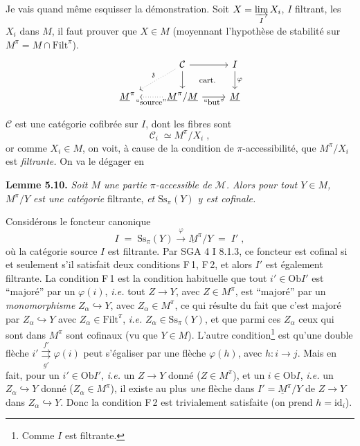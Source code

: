 \documentclass[11pt]{article}
\newcommand{\printedpage}[1]{\marginpar{\raggedright\footnotesize p.~#1}}
\newcommand{\msp}[1]{\marginpar{\raggedright\footnotesize [#1]}}
\newcommand{\Filt}{\mathrm{Filt}}
\newcommand{\Ob}{\mathrm{Ob}}
\newcommand{\Ss}{\mathrm{Ss}}
\newcommand{\M}{\mathcal{M}}
\newcommand{\Ci}{\mathcal{C}}
\begin{document}
\msp{page 62}

Je vais quand même esquisser la démonstration. Soit $X = \varinjlim\limits_{I} X_i$, $I$ filtrant, les $X_i$ dans $M$, il faut prouver que $X \in M$ (moyennant l'hypothèse de stabilité sur $M^\pi = M \cap \Filt^\pi$).
\printedpage{37}
\[
\begin{tikzcd}
& \Ci \arrow[r] \arrow[d] \arrow[dl, dotted, "\mathfrak{z}"'] \arrow[dr, phantom, "\text{\footnotesize cart.}"] & I \arrow[d, "\varphi"] \\
\underline{M}^\pi & \underline{M}^\pi/\underline{M} \arrow[l, dotted, "\text{\footnotesize “source”}"] \arrow[r, "\text{\footnotesize “but”}"'] & \underline{M}
\end{tikzcd}
\] %

$\Ci$ est une catégorie cofibrée sur $I$, dont les fibres sont
\[
\Ci_i \;\simeq M^\pi/X_i \;,
\]
or comme $X_i \in M$, on voit, à cause de la condition de $\pi$-accessibilité, que $M^\pi/X_i$ est \textit{filtrante.} On va le dégager en

\textbf{Lemme 5.10.} \textit{Soit $M$ une partie $\pi$-accessible de $\M$. Alors pour tout $Y \in M$, $M^\pi/Y$ est une catégorie} filtrante, \textit{et $\Ss_\pi(Y)$ y est cofinale.}

\msp{page 63}

Considérons le foncteur canonique
\[
I \;=\; \Ss_\pi(Y) \xrightarrow{\;\varphi\;} \underline{M}^\pi/Y \;=\; I' \;,
\]
où la catégorie source $I$ est filtrante. Par SGA 4 I 8.1.3, ce foncteur est cofinal si et seulement s'il satisfait deux conditions F\,1, F\,2, et alors $I'$ est également filtrante. La condition F\,1 est la condition habituelle que tout $i' \in \Ob I'$ est “majoré” par un $\varphi(i)$, \textit{i.e.} tout $Z \longrightarrow Y$, avec $Z \in M^\pi$, est “majoré” par un \textit{monomorphisme} $Z_\alpha \hookrightarrow Y$, avec $Z_\alpha \in M^\pi$, ce qui résulte du fait que c'est majoré par $Z_\alpha \hookrightarrow Y$ avec $Z_\alpha \in \Filt^\pi$, \textit{i.e.} $Z_\alpha \in \Ss_\pi(Y)$, et que parmi ces $Z_\alpha$ ceux qui sont dans $M^\pi$ sont cofinaux (vu que $Y \in M$). L'autre condition\footnote[23]{Comme $I$ est filtrante.} est qu'une double flèche $i' \overset{f'}{\underset{g'}{\rightrightarrows}} \varphi(i)$ peut
\msp{page 64}
s'égaliser par une flèche $\varphi(h)$, avec $h : i \longrightarrow j$. Mais en fait, pour un $i' \in \Ob I'$, \textit{i.e.} un $Z \longrightarrow Y$ donné ($Z \in M^\pi$), et un $i \in \Ob I$, \textit{i.e.} un $Z_\alpha \hookrightarrow Y$ donné ($Z_\alpha \in M^\pi$), il existe au plus \textit{une} flèche dans $I' = \underline{M}^\pi/Y$ de $Z \longrightarrow Y$ dans $Z_\alpha \hookrightarrow Y$. Donc la condition F\,2 est trivialement satisfaite (on prend $h = \mathrm{id}_i$).
\end{document}
